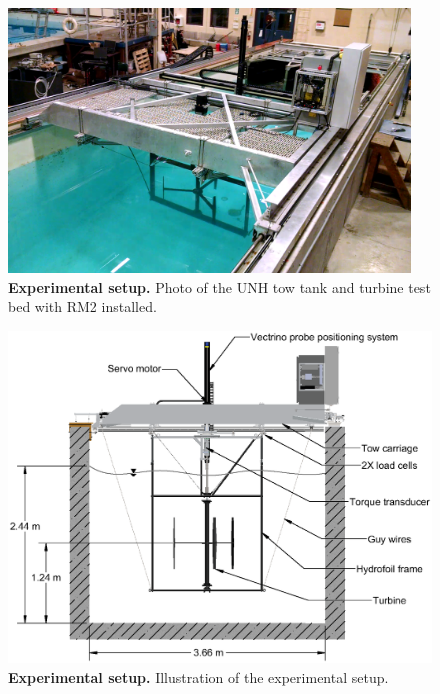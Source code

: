 \documentclass[10pt,letterpaper]{article}
\begin{document}
\begin{figure}[h]
    \centering

    \includegraphics[width=0.95\textwidth]{figures/exp-setup-photo}

    \caption{\textbf{Experimental setup.} Photo of the UNH tow tank and turbine
    test bed with RM2 installed.}

    \label{fig:exp-setup-photo}
\end{figure}

\begin{figure}[h]
    \centering

    \includegraphics[clip,trim=0.01in 0 0 0,
    width=\textwidth]{figures/tank_cross_section}

    \caption{{\bf Experimental setup.} Illustration of the experimental setup.}

    \label{fig:exp-setup}
\end{figure}
\end{document}
